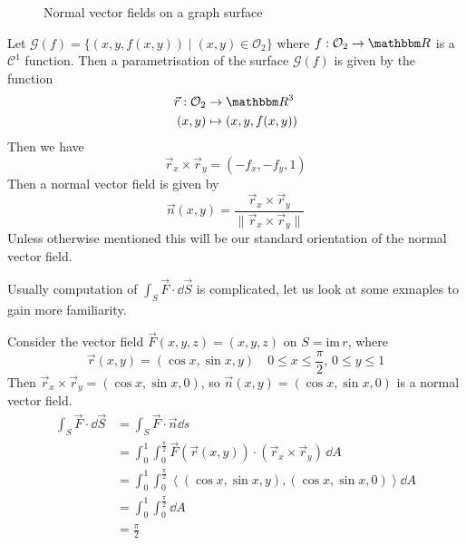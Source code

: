 \documentclass[Analysis-3]{subfiles}
\begin{document}
\begin{Eg}{}{}
    \begin{figure}
        \centering
        \caption{Normal vector fields on a graph surface}
        \label{fig2:27}
    \end{figure}
    Let $\mathcal{G}(f) = \{ (x,y,f(x,y)) \mid (x,y) \in \mathcal{O}_2\}$ where $f : \mathcal{O}_2 \to \R$ is a $\mathscr{C}^1$ function. Then a parametrisation of the surface $\mathcal{G}(f)$ is given by the function 
    \begin{align*}
        \vec{r} : \mathcal{O}_2 &\to \R^3 \\ 
        (x,y) &\mapsto (x,y,f(x,y))
    \end{align*}
    Then we have 
    \[
        \vec{r}_x \times \vec{r}_y = (-f_x, -f_y, 1)    
    \]
    Then a normal vector field is given by 
    \[
        \vec{n}(x,y) = \frac{\vec{r}_x \times \vec{r}_y}{\|\vec{r}_x \times \vec{r}_y \|}    
    \]
    Unless otherwise mentioned this will be our standard orientation of the normal vector field. 
\end{Eg}

Usually computation of $\int_S \vec{F} \cdot \dd \vec{S}$ is complicated, let us look at some exmaples to gain more familiarity. 

\begin{Eg}{}{}
    Consider the vector field $\vec{F}(x,y,z) = (x,y,z)$ on $S = \mathrm{im} \, r$, where 
    \[
        \vec{r}(x,y) = (\cos x, \sin x, y) \quad 0 \leq x \leq \frac{\pi}{2}, \, 0 \leq y \leq 1    
    \]
    Then $\vec{r}_x \times \vec{r}_y = (\cos x, \sin x, 0)$, so $\vec{n}(x,y) = (\cos x, \sin x, 0)$ is a normal vector field. 
    \begin{align*}
        \int_S \vec{F} \cdot \dd \vec{S} &= \int_S \vec{F} \cdot \vec{n} \dd s \\ 
        &= \int_0^1 \int_0^{\frac{\pi}{2}} \vec{F}(\vec{r}(x,y)) \cdot (\vec{r}_x \times \vec{r}_y) \, \dd A \\ 
        &= \int_0^1 \int_0^{\frac{\pi}{2}} \left\langle (\cos x, \sin x , y) , (\cos x, \sin x, 0)\right\rangle \dd A \\ 
        &= \int_0^1 \int_{0}^{\frac{\pi}{2}} \dd A \\ 
        &= \frac{\pi}{2} 
    \end{align*}
\end{Eg}
\end{document}
